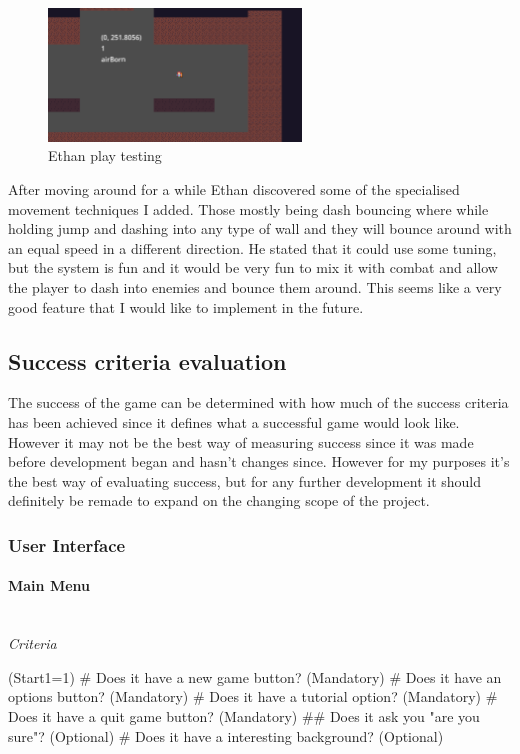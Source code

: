\documentclass{article}
\newcommand{\myparagraph}[1]{\paragraph{#1}\mbox{}\\} %
\newcommand{\smallBr}{\vspace{1.5mm}}
\begin{document}
\begin{figure}[H]
\centering
\includegraphics[width=0.6\textwidth]{ethan testing}
\caption{Ethan play testing}
\label{ethan_test}
\end{figure}

After moving around for a while Ethan discovered some of the specialised movement techniques I added. Those mostly being dash bouncing where while holding jump and dashing into any type of wall and they will bounce around with an equal speed in a different direction. He stated that it could use some tuning, but the system is fun and it would be very fun to mix it with combat and allow the player to dash into enemies and bounce them around. This seems like a very good feature that I would like to implement in the future.

\subsection{Success criteria evaluation}
The success of the game can be determined with how much of the success criteria has been achieved since it defines what a successful game would look like. However it may not be the best way of measuring success since it was made before development began and hasn't changes since. However for my purposes it's the best way of evaluating success, but for any further development it should definitely be remade to expand on the changing scope of the project.

\subsubsection{User Interface}

\myparagraph{Main Menu} \smallBr
\textit{Criteria}
\begin{easylist}
\ListProperties(Start1=1)
# Does it have a new game button? (Mandatory)
# Does it have an options button? (Mandatory)
# Does it have a tutorial option? (Mandatory)
# Does it have a quit game button? (Mandatory)
## Does it ask you "are you sure"? (Optional)
# Does it have a interesting background? (Optional) 
\end{easylist}
\end{document}
